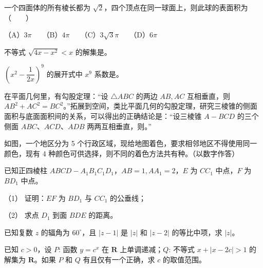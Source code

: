 \begin{question}
一个四面体的所有棱长都为 $\sqrt{2}$，四个顶点在同一球面上，则此球的表面积为\mbox{（　　）}

（A）$3\pi$　　（B）$4\pi$　　（C）$3\sqrt{3}\pi$　　（D）$6\pi$

\end{question}
\begin{question}
不等式 $\sqrt{4x - x^2} < x$ 的解集是\gkblank{}。

\end{question}
\begin{question}
$\left(x^2 - \dfrac{1}{2x}\right)^9$ 的展开式中 $x^9$ 系数是\gkblank{}。

\end{question}
\begin{question}
在平面几何里，有勾股定理：“设 $\triangle ABC$ 的两边 $AB, AC$ 互相垂直，则 $AB^2 + AC^2 = BC^2$。”拓展到空间，类比平面几何的勾股定理，研究三棱锥的侧面面积与底面面积间的关系，可以得出的正确结论是：“设三棱锥 $A-BCD$ 的三个侧面 $ABC$、$ACD$、$ADB$ 两两互相垂直，则\gkblank{}。”

\Needspace{0.4\textheight}
\end{question}
\begin{question}
如图，一个地区分为 5 个行政区域，现给地图着色，要求相邻地区不得使用同一颜色，现有 4 种颜色可供选择，则不同的着色方法共有\gkblank{}种。（以数字作答）
\nopagebreak[4]
\begin{center}\end{center}
\nopagebreak[4]
\Needspace{0.4\textheight}
\end{question}
\begin{question}
已知正四棱柱 $ABCD - A_1B_1C_1D_1$，$AB = 1, AA_1 = 2$，$E$ 为 $CC_1$ 中点，$F$ 为 $BD_1$ 中点。

（1） 证明：$EF$ 为 $BD_1$ 与 $CC_1$ 的公垂线；

（2） 求点 $D_1$ 到面 $BDE$ 的距离。
\nopagebreak[4]
\begin{center}\end{center}
\nopagebreak[4]
\end{question}
\begin{question}
已知复数 $z$ 的辐角为 $60^\circ$，且 $|z - 1|$ 是 $|z|$ 和 $|z - 2|$ 的等比中项，求 $|z|$。

\end{question}
\begin{question}
已知 $c > 0$，设 $P$: 函数 $y = c^x$ 在 $\mathbf{R}$ 上单调递减；$Q$: 不等式 $x + |x - 2c| > 1$ 的解集为 $\mathbf{R}$。如果 $P$ 和 $Q$ 有且仅有一个正确，求 $c$ 的取值范围。

\Needspace{0.4\textheight}
\end{question}
